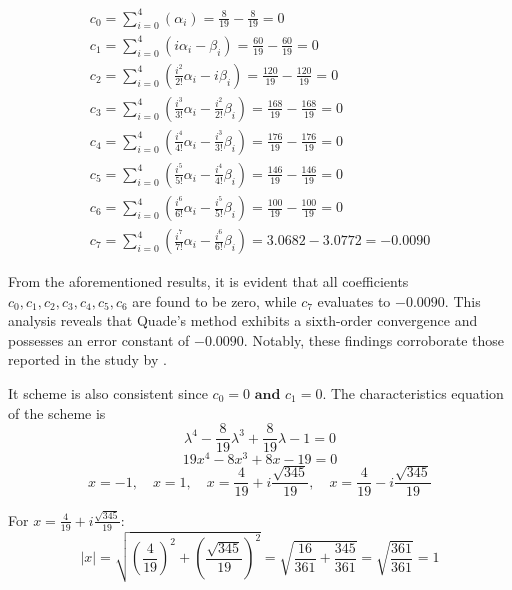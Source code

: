 \begin{eqnarray}
    c_0 = \sum_{i=0}^{4}(\alpha_i) = \frac{8}{19} - \frac{8}{19} = 0 \\
    c_1 = \sum_{i=0}^{4}(i\alpha_i - \beta_i) = \frac{60}{19} - \frac{60}{19} = 0 \\
    c_2 = \sum_{i=0}^{4}(\frac{i^2}{2!} \alpha_i - i \beta_i) = \frac{120}{19} - \frac{120}{19} = 0 \\
    c_3 = \sum_{i=0}^{4}(\frac{i^3}{3!} \alpha_i - \frac{i^2}{2!} \beta_i) = \frac{168}{19} - \frac{168}{19} = 0 \\
    c_4 = \sum_{i=0}^{4}(\frac{i^4}{4!} \alpha_i - \frac{i^3}{3!} \beta_i) = \frac{176}{19} - \frac{176}{19} = 0 \\
    c_5 = \sum_{i=0}^{4}(\frac{i^5}{5!} \alpha_i - \frac{i^4}{4!} \beta_i) = \frac{146}{19} - \frac{146}{19} = 0 \\
    c_6 = \sum_{i=0}^{4}(\frac{i^6}{6!} \alpha_i - \frac{i^5}{5!} \beta_i) = \frac{100}{19} - \frac{100}{19} = 0 \\
    c_7 = \sum_{i=0}^{4}(\frac{i^7}{7!} \alpha_i - \frac{i^6}{6!} \beta_i) = 3.0682 - 3.0772 = -0.0090
\end{eqnarray}

From the aforementioned results, it is evident that all coefficients \(c_0, c_1, c_2, c_3, c_4, c_5, c_6\) are found to be zero, while \(c_7\) evaluates to \(-0.0090\). This analysis reveals that Quade's method exhibits a sixth-order convergence and possesses an error constant of \(-0.0090\). Notably, these findings corroborate those reported in the study by \cite{Fadugba2018}.


It scheme is also consistent since \(c_0 = 0 \textbf{ and } c_1 = 0\).
The characteristics equation of the scheme is
\begin{equation}
    \lambda^4 - \frac{8}{19}\lambda^3 + \frac{8}{19}\lambda - 1  = 0
\end{equation}
\begin{equation}
    19x^4 - 8x^3 + 8x - 19 = 0
\end{equation}
\begin{equation}
    x = -1, \quad x = 1, \quad x = \frac{4}{19} + i\frac{\sqrt{345}}{19}, \quad x = \frac{4}{19} - i\frac{\sqrt{345}}{19}
\end{equation}

For \( x = \frac{4}{19} + i\frac{\sqrt{345}}{19} \):
\[
|x| = \sqrt{\left(\frac{4}{19}\right)^2 + \left(\frac{\sqrt{345}}{19}\right)^2} = \sqrt{\frac{16}{361} + \frac{345}{361}} = \sqrt{\frac{361}{361}} = 1
\]

